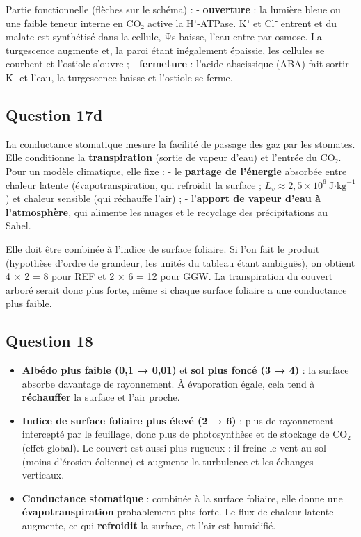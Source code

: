 \documentclass[11pt,a4paper]{article}
\providecommand{\tightlist}{\setlength{\itemsep}{0pt}\setlength{\parskip}{0pt}}
\begin{document}
Partie fonctionnelle (flèches sur le schéma) :
- \textbf{ouverture} : la lumière bleue ou une faible teneur interne en CO₂ active la H⁺-ATPase. K⁺ et Cl⁻ entrent et du malate est synthétisé dans la cellule, Ψs baisse, l'eau entre par osmose. La turgescence augmente et, la paroi étant inégalement épaissie, les cellules se courbent et l'ostiole s'ouvre ;
- \textbf{fermeture} : l'acide abscissique (ABA) fait sortir K⁺ et l'eau, la turgescence baisse et l'ostiole se ferme.

\hypertarget{question-17d}{%
\subsection{Question 17d}\label{question-17d}}

La conductance stomatique mesure la facilité de passage des gaz par les stomates. Elle conditionne la \textbf{transpiration} (sortie de vapeur d'eau) et l'entrée du CO₂. Pour un modèle climatique, elle fixe :
- le \textbf{partage de l'énergie} absorbée entre chaleur latente (évapotranspiration, qui refroidit la surface ; \(L_v\approx2{,}5\times10^6\ \text{J·kg}^{-1}\)) et chaleur sensible (qui réchauffe l'air) ;
- l'\textbf{apport de vapeur d'eau à l'atmosphère}, qui alimente les nuages et le recyclage des précipitations au Sahel.

Elle doit être combinée à l'indice de surface foliaire. Si l'on fait le produit (hypothèse d'ordre de grandeur, les unités du tableau étant ambiguës), on obtient 4 × 2 = 8 pour REF et 2 × 6 = 12 pour GGW. La transpiration du couvert arboré serait donc plus forte, même si chaque surface foliaire a une conductance plus faible.

\hypertarget{question-18}{%
\subsection{Question 18}\label{question-18}}

\begin{itemize}
\tightlist
\item
  \textbf{Albédo plus faible (0,1 → 0,01)} et \textbf{sol plus foncé (3 → 4)} : la surface absorbe davantage de rayonnement. À évaporation égale, cela tend à \textbf{réchauffer} la surface et l'air proche.
\item
  \textbf{Indice de surface foliaire plus élevé (2 → 6)} : plus de rayonnement intercepté par le feuillage, donc plus de photosynthèse et de stockage de CO₂ (effet global). Le couvert est aussi plus rugueux : il freine le vent au sol (moins d'érosion éolienne) et augmente la turbulence et les échanges verticaux.
\item
  \textbf{Conductance stomatique} : combinée à la surface foliaire, elle donne une \textbf{évapotranspiration} probablement plus forte. Le flux de chaleur latente augmente, ce qui \textbf{refroidit} la surface, et l'air est humidifié.
\end{itemize}
\end{document}
